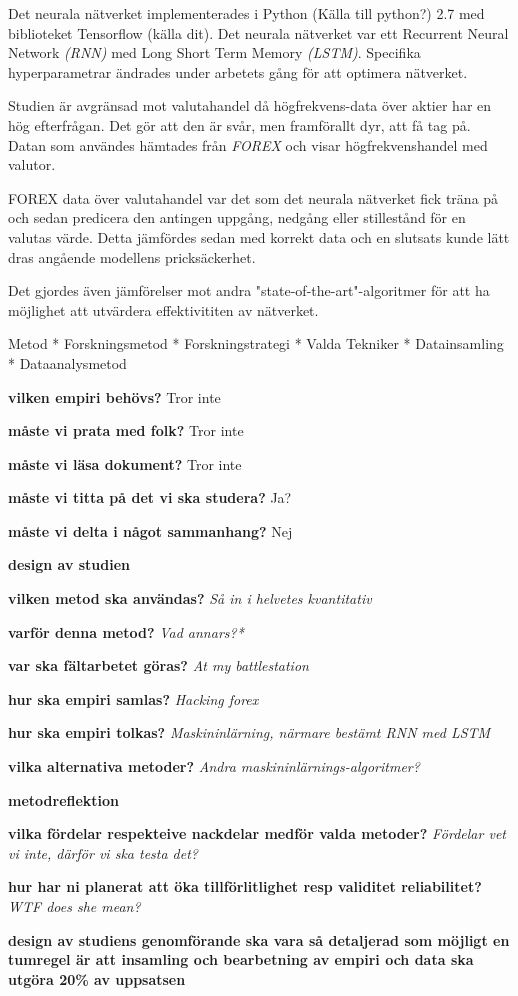 Det neurala nätverket implementerades i Python (Källa till python?) 2.7 med biblioteket Tensorflow (källa dit). Det neurala nätverket var ett Recurrent Neural Network \textit{(RNN)} med Long Short Term Memory \textit{(LSTM)}. Specifika hyperparametrar ändrades under arbetets gång för att optimera nätverket. 

Studien är avgränsad mot valutahandel då högfrekvens-data över aktier har en hög efterfrågan. Det gör att den är svår, men framförallt dyr, att få tag på. Datan som användes hämtades från \textit{FOREX} och visar högfrekvenshandel med valutor. 

FOREX data över valutahandel var det som det neurala nätverket fick träna på och sedan predicera den antingen uppgång, nedgång eller stillestånd för en valutas värde. Detta jämfördes sedan med korrekt data och en slutsats kunde lätt dras angående modellens pricksäckerhet. 

Det gjordes även jämförelser mot andra "state-of-the-art"-algoritmer för att ha möjlighet att utvärdera effektivititen av nätverket. 






Metod
* Forskningsmetod
* Forskningstrategi
* Valda Tekniker
* Datainsamling
* Dataanalysmetod

\textbf{vilken empiri behövs?} Tror inte

\textbf{måste vi prata med folk?} Tror inte

\textbf{måste vi läsa dokument?} Tror inte

\textbf{måste vi titta på det vi ska studera?} Ja?

\textbf{måste vi delta i något sammanhang?} Nej

\textbf{design av studien}

\textbf{vilken metod ska användas?}
\textit{Så in i helvetes kvantitativ}

\textbf{varför denna metod?}
\textit{Vad annars?*}

\textbf{var ska fältarbetet göras?}
\textit{At my battlestation}

\textbf{hur ska empiri samlas?}
\textit{Hacking forex}

\textbf{hur ska empiri tolkas?}
\textit{Maskininlärning, närmare bestämt RNN med LSTM}

\textbf{vilka alternativa metoder?}
\textit{Andra maskininlärnings-algoritmer?}

\textbf{metodreflektion}

\textbf{vilka fördelar respekteive nackdelar medför valda metoder?}
\textit{Fördelar vet vi inte, därför vi ska testa det?}

\textbf{hur har ni planerat att öka tillförlitlighet resp validitet reliabilitet?}
\textit{WTF does she mean?}

\textbf{design av studiens genomförande ska vara så detaljerad som möjligt en tumregel är att insamling och bearbetning av empiri och data ska utgöra 20\% av uppsatsen}
